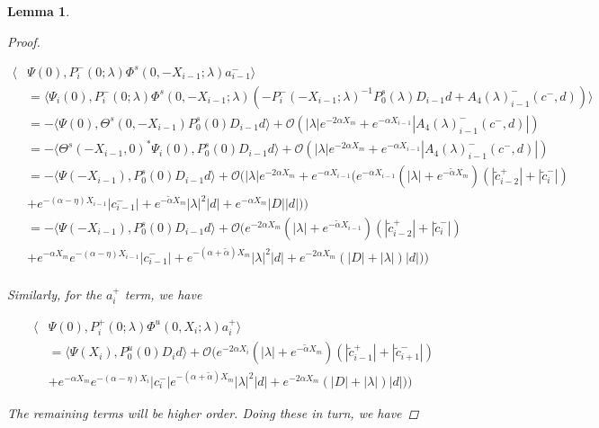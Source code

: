 \documentclass[12pt]{article}
\newtheorem{lemma}{Lemma}
\begin{document}
\begin{lemma}
\begin{proof}
\begin{enumerate}
\begin{align*}
\langle &\Psi(0), P_i^-(0; \lambda) \Phi^s(0, -X_{i-1}; \lambda) a_{i-1}^- \rangle \\
&= \langle \Psi_i(0), P_i^-(0; \lambda) \Phi^s(0, -X_{i-1}; \lambda) (- P_i^-(-X_{i-1}; \lambda)^{-1} P_0^s(\lambda) D_{i-1} d + A_4(\lambda)_{i-1}^-(c^-, d)) \rangle \\
&= -\langle \Psi(0), \Theta^s(0, -X_{i-1}) P_0^s(0) D_{i-1} d \rangle + \mathcal{O}( |\lambda|e^{-2 \alpha X_m} + e^{-\alpha X_{i-1}} |A_4(\lambda)_{i-1}^-(c^-, d)|)\\
&= -\langle \Theta^s(-X_{i-1}, 0)^* \Psi_i(0), P_0^s(0) D_{i-1} d \rangle + \mathcal{O}( |\lambda|e^{-2 \alpha X_m} + e^{-\alpha X_{i-1}} |A_4(\lambda)_{i-1}^-(c^-, d)|)\\
&= -\langle \Psi(-X_{i-1}), P_0^s(0) D_{i-1} d \rangle + \mathcal{O}\Big( |\lambda|e^{-2 \alpha X_m} + e^{-\alpha X_{i-1}} ( 
e^{-\alpha X_{i-1}}(|\lambda| + e^{-\tilde{\alpha}X_m})(|\tilde{c}_{i-2}^+| + |\tilde{c}_i^-|) \\
&+ e^{-(\alpha - \eta) X_{i-1}} |c_{i-1}^-| + e^{-\tilde{\alpha} X_m} |\lambda|^2|d| + e^{-\alpha X_m}|D||d|) \Big) \\
&= -\langle \Psi(-X_{i-1}), P_0^s(0) D_{i-1} d \rangle 
+ \mathcal{O}\Big(  
e^{-2 \alpha X_m}(|\lambda| + e^{-\tilde{\alpha}X_{i-1}})(|\tilde{c}_{i-2}^+| + |\tilde{c}_i^-|) \\
&+ e^{-\alpha X_m}e^{-(\alpha - \eta) X_{i-1}} |c_{i-1}^-| + e^{-(\alpha + \tilde{\alpha}) X_m} |\lambda|^2|d| + e^{-2 \alpha X_m}(|D| + |\lambda|)|d|) \Big) \\ 
\end{align*}

Similarly, for the $a_i^+$ term, we have

\begin{align*}
\langle &\Psi(0), P_i^+(0; \lambda) \Phi^u(0, X_i; \lambda) a_i^+ \rangle \\
&= \langle \Psi(X_i), P_0^u(0) D_i d \rangle + \mathcal{O}\Big( e^{-2 \alpha X_i} (|\lambda| + e^{-\tilde{\alpha}X_m})(|\tilde{c}_{i-1}^+| + |\tilde{c}_{i+1}^-|) \\
&+ e^{-\alpha X_m} e^{-(\alpha - \eta) X_i} |c_i^-| e^{-(\alpha + \tilde{\alpha}) X_m} |\lambda|^2|d| + e^{-2 \alpha X_m}(|D| + |\lambda|)|d|) \Big)
\end{align*}

\end{enumerate}

The remaining terms will be higher order. Doing these in turn, we have


\end{proof}
\end{lemma}
\end{document}
